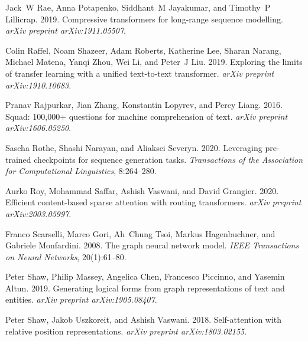 \documentclass[11pt,a4paper]{article}
\begin{document}
\begin{thebibliography}{44}
Jack~W Rae, Anna Potapenko, Siddhant~M Jayakumar, and Timothy~P Lillicrap.
  2019.
\newblock Compressive transformers for long-range sequence modelling.
\newblock \emph{arXiv preprint arXiv:1911.05507}.

Colin Raffel, Noam Shazeer, Adam Roberts, Katherine Lee, Sharan Narang, Michael
  Matena, Yanqi Zhou, Wei Li, and Peter~J Liu. 2019.
\newblock Exploring the limits of transfer learning with a unified text-to-text
  transformer.
\newblock \emph{arXiv preprint arXiv:1910.10683}.

Pranav Rajpurkar, Jian Zhang, Konstantin Lopyrev, and Percy Liang. 2016.
\newblock Squad: 100,000+ questions for machine comprehension of text.
\newblock \emph{arXiv preprint arXiv:1606.05250}.

Sascha Rothe, Shashi Narayan, and Aliaksei Severyn. 2020.
\newblock Leveraging pre-trained checkpoints for sequence generation tasks.
\newblock \emph{Transactions of the Association for Computational Linguistics},
  8:264--280.

Aurko Roy, Mohammad Saffar, Ashish Vaswani, and David Grangier. 2020.
\newblock Efficient content-based sparse attention with routing transformers.
\newblock \emph{arXiv preprint arXiv:2003.05997}.

Franco Scarselli, Marco Gori, Ah~Chung Tsoi, Markus Hagenbuchner, and Gabriele
  Monfardini. 2008.
\newblock The graph neural network model.
\newblock \emph{IEEE Transactions on Neural Networks}, 20(1):61--80.

Peter Shaw, Philip Massey, Angelica Chen, Francesco Piccinno, and Yasemin
  Altun. 2019.
\newblock Generating logical forms from graph representations of text and
  entities.
\newblock \emph{arXiv preprint arXiv:1905.08407}.

Peter Shaw, Jakob Uszkoreit, and Ashish Vaswani. 2018.
\newblock Self-attention with relative position representations.
\newblock \emph{arXiv preprint arXiv:1803.02155}.


\end{thebibliography}
\end{document}
